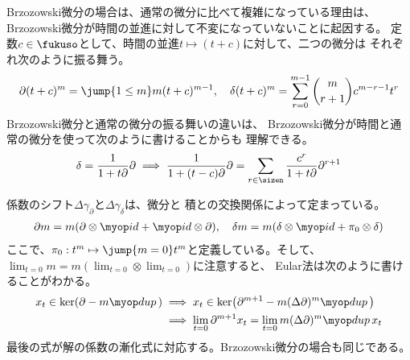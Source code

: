 {	Brzozowski微分の場合は、通常の微分に比べて複雑になっている理由は、
	Brzozowski微分が時間の並進に対して不変になっていないことに起因する。
	定数$c\in\fukuso$として、時間の並進$t\mapsto(t+c)$に対して、二つの微分は
	それぞれ次のように振る舞う。
	\begin{equation*}\begin{split}
		\partial(t+c)^m = \jump{1\le m} m(t+c)^{m-1}
		,\quad \delta(t+c)^m = \sum_{r=0}^{m-1} \binom{m}{r+1}c^{m-r-1}t^r
	\end{split}\end{equation*}
	Brzozowski微分と通常の微分の振る舞いの違いは、
	Brzozowski微分が時間と通常の微分を使って次のように書けることからも
	理解できる。
	\begin{equation*}\begin{split}
		\delta = \frac{1}{1 + t\partial}\partial
		\implies \frac{1}{1 + (t-c)\partial}\partial
		= \sum_{r\in\sizen}\frac{c^r}{1 + t\partial}\partial^{r+1}
	\end{split}\end{equation*}

	係数のシフト$\Delta\gamma_\partial$と$\Delta\gamma_\delta$は、微分と
	積との交換関係によって定まっている。
	\begin{equation*}\begin{split}
		\partial m = m(\partial\otimes\id + \id\otimes\partial),\quad
		\delta m = m(\delta\otimes\id + \pi_0\otimes\delta)
	\end{split}\end{equation*}
	ここで、$\pi_0:t^m\mapsto\jump{m=0}t^m$と定義している。そして、
	$\lim_{t=0}m=m(\lim_{t=0}\otimes\lim_{t=0})$に注意すると、
	Eular法は次のように書けることがわかる。
	\begin{equation}\label{eq:Eular法その一}\begin{split}
		x_t\in\ker(\partial - m\dup)
		&\implies x_t\in\ker\bigl(
			\partial^{m+1} - m(\Delta\partial)^m\dup\bigr) \\
		&\implies \lim_{t=0}\partial^{m+1}x_t 
			= \lim_{t=0}m(\Delta\partial)^m\dup x_t \\
	\end{split}\end{equation}
	最後の式が解の係数の漸化式に対応する。Brzozowski微分の場合も同じである。
}
